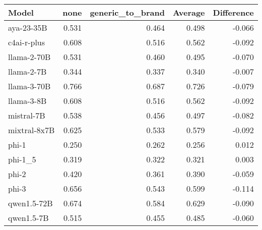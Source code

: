 \begin{tabular}{lrrrr}
\toprule
Model & none & generic_to_brand & Average & Difference \\
\midrule
aya-23-35B & 0.531 & 0.464 & 0.498 & -0.066 \\
c4ai-r-plus & 0.608 & 0.516 & 0.562 & -0.092 \\
llama-2-70B & 0.531 & 0.460 & 0.495 & -0.070 \\
llama-2-7B & 0.344 & 0.337 & 0.340 & -0.007 \\
llama-3-70B & 0.766 & 0.687 & 0.726 & -0.079 \\
llama-3-8B & 0.608 & 0.516 & 0.562 & -0.092 \\
mistral-7B & 0.538 & 0.456 & 0.497 & -0.082 \\
mixtral-8x7B & 0.625 & 0.533 & 0.579 & -0.092 \\
phi-1 & 0.250 & 0.262 & 0.256 & 0.012 \\
phi-1_5 & 0.319 & 0.322 & 0.321 & 0.003 \\
phi-2 & 0.420 & 0.361 & 0.390 & -0.059 \\
phi-3 & 0.656 & 0.543 & 0.599 & -0.114 \\
qwen1.5-72B & 0.674 & 0.584 & 0.629 & -0.090 \\
qwen1.5-7B & 0.515 & 0.455 & 0.485 & -0.060 \\
\bottomrule
\end{tabular}
